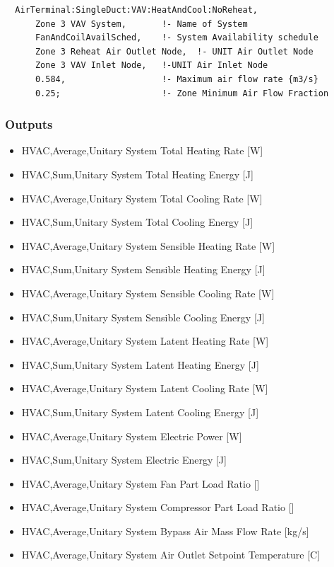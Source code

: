 \begin{lstlisting}
  AirTerminal:SingleDuct:VAV:HeatAndCool:NoReheat,
      Zone 3 VAV System,       !- Name of System
      FanAndCoilAvailSched,    !- System Availability schedule
      Zone 3 Reheat Air Outlet Node,  !- UNIT Air Outlet Node
      Zone 3 VAV Inlet Node,   !-UNIT Air Inlet Node
      0.584,                   !- Maximum air flow rate {m3/s}
      0.25;                    !- Zone Minimum Air Flow Fraction
\end{lstlisting}

\subsubsection{Outputs}\label{outputs-7-011}

\begin{itemize}
\item
  HVAC,Average,Unitary System Total Heating Rate {[}W{]}
\item
  HVAC,Sum,Unitary System Total Heating Energy {[}J{]}
\item
  HVAC,Average,Unitary System Total Cooling Rate {[}W{]}
\item
  HVAC,Sum,Unitary System Total Cooling Energy {[}J{]}
\item
  HVAC,Average,Unitary System Sensible Heating Rate {[}W{]}
\item
  HVAC,Sum,Unitary System Sensible Heating Energy {[}J{]}
\item
  HVAC,Average,Unitary System Sensible Cooling Rate {[}W{]}
\item
  HVAC,Sum,Unitary System Sensible Cooling Energy {[}J{]}
\item
  HVAC,Average,Unitary System Latent Heating Rate {[}W{]}
\item
  HVAC,Sum,Unitary System Latent Heating Energy {[}J{]}
\item
  HVAC,Average,Unitary System Latent Cooling Rate {[}W{]}
\item
  HVAC,Sum,Unitary System Latent Cooling Energy {[}J{]}
\item
  HVAC,Average,Unitary System Electric Power {[}W{]}
\item
  HVAC,Sum,Unitary System Electric Energy {[}J{]}
\item
  HVAC,Average,Unitary System Fan Part Load Ratio {[]}
\item
  HVAC,Average,Unitary System Compressor Part Load Ratio {[]}
\item
  HVAC,Average,Unitary System Bypass Air Mass Flow Rate {[}kg/s{]}
\item
  HVAC,Average,Unitary System Air Outlet Setpoint Temperature {[}C{]}
\end{itemize}


